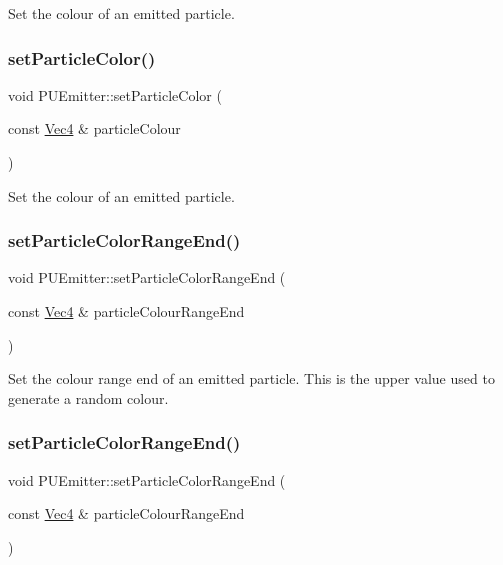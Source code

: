 Set the colour of an emitted particle. \mbox{\label{classPUEmitter_a0d0e51b19fd247625f86ed120dc0fe94}} 
\subsubsection{\texorpdfstring{set\+Particle\+Color()}{setParticleColor()}\hspace{0.1cm}{\footnotesize\ttfamily [2/2]}}
{\footnotesize\ttfamily void P\+U\+Emitter\+::set\+Particle\+Color (\begin{DoxyParamCaption}\item[{const \hyperlink{classVec4}{Vec4} \&}]{particle\+Colour }\end{DoxyParamCaption})}

Set the colour of an emitted particle. \mbox{\label{classPUEmitter_ad4631d131294b6a7148b7914335d0d4f}} 
\subsubsection{\texorpdfstring{set\+Particle\+Color\+Range\+End()}{setParticleColorRangeEnd()}\hspace{0.1cm}{\footnotesize\ttfamily [1/2]}}
{\footnotesize\ttfamily void P\+U\+Emitter\+::set\+Particle\+Color\+Range\+End (\begin{DoxyParamCaption}\item[{const \hyperlink{classVec4}{Vec4} \&}]{particle\+Colour\+Range\+End }\end{DoxyParamCaption})}

Set the colour range end of an emitted particle. This is the upper value used to generate a random colour. \mbox{\label{classPUEmitter_ad4631d131294b6a7148b7914335d0d4f}} 
\subsubsection{\texorpdfstring{set\+Particle\+Color\+Range\+End()}{setParticleColorRangeEnd()}\hspace{0.1cm}{\footnotesize\ttfamily [2/2]}}
{\footnotesize\ttfamily void P\+U\+Emitter\+::set\+Particle\+Color\+Range\+End (\begin{DoxyParamCaption}\item[{const \hyperlink{classVec4}{Vec4} \&}]{particle\+Colour\+Range\+End }\end{DoxyParamCaption})}

